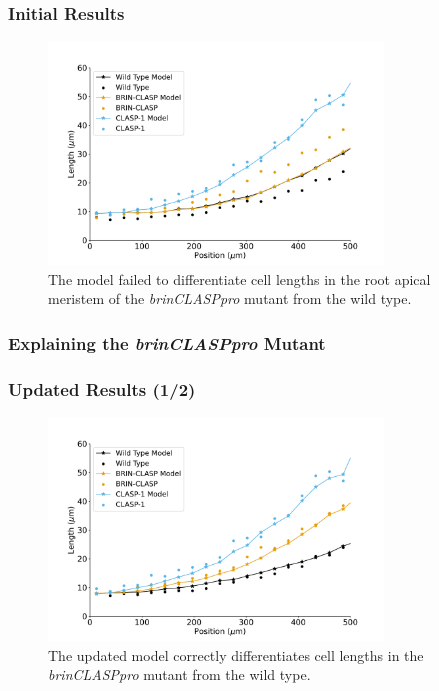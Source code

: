 \documentclass{beamer}
\begin{document}
\begin{frame}
\frametitle{Initial Results}
\begin{figure}
  \centering
  \includegraphics[height=16em]{column-original-fit.pdf}
  \caption{The model failed to differentiate cell lengths in the root apical meristem of the \emph{brinCLASPpro} mutant from the wild type.}
\end{figure}
\end{frame}

\begin{frame}
\frametitle{Explaining the \emph{brinCLASPpro} Mutant}

\bigskip

 
\end{frame}

\begin{frame}
\frametitle{Updated Results (1/2)}
\begin{figure}
  \centering
  \includegraphics[height=16em]{column-modified-fit.pdf}
  \caption{The updated model correctly differentiates cell lengths in the \emph{brinCLASPpro} mutant from the wild type.}
\end{figure}
\end{frame}
\end{document}
